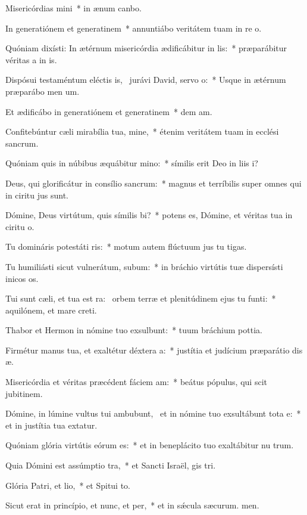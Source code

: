 \item Misericórdias mini~* in ænum canbo.
\item In generatiónem et generatinem~* annuntiábo veritátem tuam in re o.
\item Quóniam dixísti: In ætérnum misericórdia ædificábitur in lis:~* præparábitur véritas a in is.
\item Dispósui testaméntum eléctis is,~\pscross{} jurávi David, servo o:~* Usque in ætérnum præparábo men um.
\item Et ædificábo in generatiónem et generatinem~* dem am.
\item Confitebúntur cæli mirabília tua, mine,~* étenim veritátem tuam in ecclési sancrum.
\item Quóniam quis in núbibus æquábitur mino:~* símilis erit Deo in liis i?
\item Deus, qui glorificátur in consílio sancrum:~* magnus et terríbilis super omnes qui in ciritu jus sunt.
\item Dómine, Deus virtútum, quis símilis bi?~* potens es, Dómine, et véritas tua in ciritu o.
\item Tu domináris potestáti ris:~* motum autem flúctuum jus tu tigas.
\item Tu humiliásti sicut vulnerátum, subum:~* in bráchio virtútis tuæ dispersísti inicos os.
\item Tui sunt cæli, et tua est ra:~\pscross{} orbem terræ et plenitúdinem ejus tu funti:~* aquilónem, et mare  creti.
\item Thabor et Hermon in nómine tuo exsulbunt:~* tuum bráchium  pottia.
\item Firmétur manus tua, et exaltétur déxtera a:~* justítia et judícium præparátio dis æ.
\item Misericórdia et véritas præcédent fáciem am:~* beátus pópulus, qui scit jubitinem.
\item Dómine, in lúmine vultus tui ambubunt,~\pscross{} et in nómine tuo exsultábunt tota e:~* et in justítia tua extatur.
\item Quóniam glória virtútis eórum  es:~* et in beneplácito tuo exaltábitur nu trum.
\item Quia Dómini est assúmptio tra,~* et Sancti Israël, gis tri.
\item Glória Patri, et lio,~* et Spitui to.
\item Sicut erat in princípio, et nunc, et per,~* et in sǽcula sæcurum. men.

